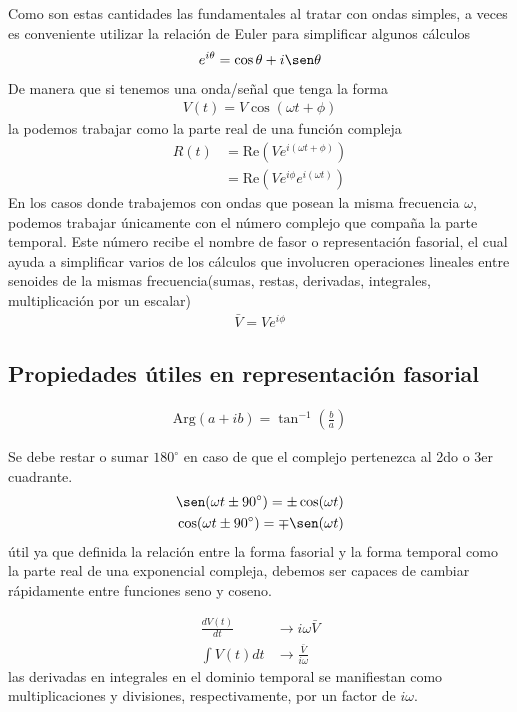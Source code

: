\documentclass[12pt]{article}
\begin{document}
Como son estas cantidades las fundamentales al tratar con ondas simples, a veces es conveniente utilizar la relación de Euler para simplificar algunos cálculos
\begin{align*}
    e^{i\theta} = \cos\theta + i \sen\theta
\end{align*}
De manera que si tenemos una onda/señal que tenga la forma 
\begin{align*}
    V(t) = V\cos(\omega t + \phi)
\end{align*}
la podemos trabajar como la parte real de una función compleja
\begin{align*}
    R(t) &= \text{Re}(V e^{i(\omega t + \phi)})\\
    &= \text{Re}(V e^{i\phi} e^{i(\omega t)})
\end{align*}
En los casos donde trabajemos con ondas que posean la misma frecuencia \(\omega\), podemos trabajar únicamente con el número complejo que compaña la parte temporal. Este número recibe el nombre de fasor o representación fasorial, el cual ayuda a simplificar varios de los cálculos que involucren operaciones lineales entre senoides de la mismas frecuencia(sumas, restas, derivadas, integrales, multiplicación por un escalar)
\begin{align*}
    \bar{V} = V e^{i\phi} \tag{representación fasorial de \(V(t)\)}
\end{align*}
\subsection{Propiedades útiles en representación fasorial}
\begin{align*}
    \text{Arg}(a+ib ) = \tan^{-1} \left(\frac{b}{a}\right)
\end{align*}

Se debe restar o sumar \(180^{\circ}\) en caso de que el complejo pertenezca al 2do o 3er cuadrante.
\begin{align*}
    \sen(\omega t \pm 90^{\circ}) = \pm \cos(\omega t )\\
    \cos( \omega t \pm 90^{\circ}) = \mp \sen(\omega t )
\end{align*}
útil ya que definida la relación entre la forma fasorial y la forma temporal como la parte real de una exponencial compleja, debemos ser capaces de cambiar rápidamente entre funciones seno y coseno.

\begin{align*}
    \frac{dV(t)}{dt} &\rightarrow i\omega \bar{V}\\
    \int V(t) dt &\rightarrow \frac{\bar{V}}{i \omega}
\end{align*}
las derivadas  en integrales en el dominio temporal se manifiestan como multiplicaciones y divisiones, respectivamente, por un factor de \(i \omega\).\\
\end{document}
